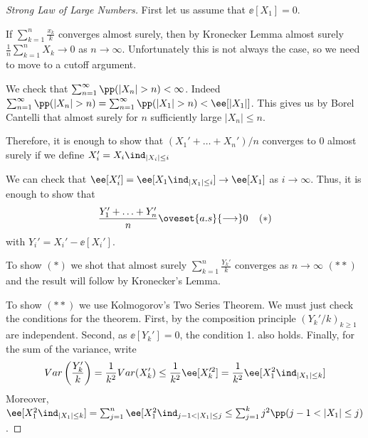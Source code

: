 \documentclass[../main.tex]{subfiles}
\begin{document}
   \begin{proof}
     [Strong Law of Large Numbers]
     \hfill

     \vspace{0.5em}

     First let us assume that $\ee[X_1] = 0$.
     \vspace{0.5em}

     If $\sum_{k=1}^n \frac{x_k}{k} $ converges almost surely, then by
     Kronecker Lemma almost surely $\frac{1}{n} \sum_{k=1}^n X_k \to 0 $ as $n
     \to \infty$. Unfortunately this is not always the case, so we need to
     move to a cutoff argument.

     \vspace{0.5em}
     
     We check that $\sum_{n=1}^\infty \pp(|X_n| > n) < \infty$. Indeed 
     $\sum_{n = 1}^\infty \pp(|X_n| > n) = \sum_{n=1}^\infty \pp(|X_1| > n) <
     \ee[|X_1|]$. This gives us by Borel Cantelli that almost surely for $n$
     sufficiently large $|X_n| \leq n$. 

     \vspace{0.5em}

     Therefore, it is enough to show that $(X_1' + \ldots + X_n')/n$ converges
     to $0$ almost surely if we define $X_i' = X_i \ind_{|X_i| \leq i}$

     \vspace{0.5em}

     We can check that $\ee[X_i'] = \ee[X_1 \ind_{|X_1| \leq i}] \to \ee[X_1]$
     as $i \to \infty$. Thus, it is enough to show that 
     \[
       \frac{Y_1' + \ldots + Y_n'}{n} \oveset{a.s}{\longrightarrow} 0
       \;\;\;\;(\ast)
     \] 
     with $Y_i' = X_i' - \ee[X_i']$.

     \vspace{0.5em}

     To show $(\ast)$ we shot that almost surely $\sum_{k=1}^n \frac{Y_k'}{k}
     $ converges as $n \to \infty$ $(\ast\ast)$ and the result will follow by
     Kronecker's Lemma.

     \vspace{0.5em}

     To show $(\ast\ast)$ we use Kolmogorov's Two Series Theorem. We must just
     check the conditions for the theorem. First, by the composition principle
     $(Y_k'/k)_{k \geq 1}$ are independent. Second, as $\ee[Y_k'] = 0$, the
     condition 1. also holds. Finally, for the sum of the variance, write 
     \[
       Var \left( \frac{Y_k'}{k}  \right) = \frac{1}{k^2} Var(X_k')
       \leq \frac{1}{k^2} \ee[X_k'^2] = \frac{1}{k^2} \ee[X_1^2 \ind_{|X_1| \leq
       k}] 
     \] 
     Moreover, $\ee[X_1^2 \ind_{|X_1| \leq k}] = \sum_{j=1}^n \ee[X_1^2
     \ind_{j-1 < |X_1| \leq j} \leq \sum_{j=1}^k j^2 \pp(j-1 < |X_1| \leq j)$.


\end{proof}
\end{document}

